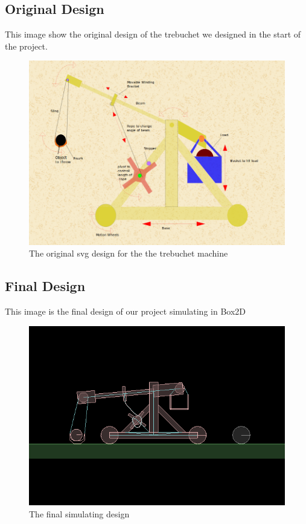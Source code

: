 \documentclass[11pt]{article}
\begin{document}
\subsection{Original Design}
This image show the original design of the trebuchet we designed in the start of the project\cite{odurl}.
\begin{figure}[!ht]
\centering
\includegraphics[scale=0.5]{lab1}
\caption{The original svg design for the the trebuchet machine}
\label{fig1}
\end{figure}
\newpage
\subsection{Final Design}
This image is the final design of our project simulating in Box2D
\begin{figure}[!ht]
\centering
\includegraphics[scale=0.5]{final}
\caption{The final simulating design }
\label{fig2}
\end{figure}
\end{document}
